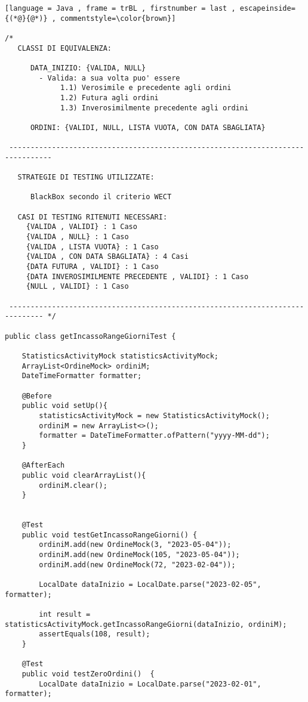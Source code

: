\begin{lstlisting}[language = Java , frame = trBL , firstnumber = last , escapeinside={(*@}{@*)} , commentstyle=\color{brown}]

/*
   CLASSI DI EQUIVALENZA:
   
      DATA_INIZIO: {VALIDA, NULL}
        - Valida: a sua volta puo' essere
             1.1) Verosimile e precedente agli ordini
             1.2) Futura agli ordini
             1.3) Inverosimilmente precedente agli ordini

      ORDINI: {VALIDI, NULL, LISTA VUOTA, CON DATA SBAGLIATA}

 --------------------------------------------------------------------------------

   STRATEGIE DI TESTING UTILIZZATE:

      BlackBox secondo il criterio WECT
      
   CASI DI TESTING RITENUTI NECESSARI:
     {VALIDA , VALIDI} : 1 Caso
     {VALIDA , NULL} : 1 Caso
     {VALIDA , LISTA VUOTA} : 1 Caso
     {VALIDA , CON DATA SBAGLIATA} : 4 Casi
     {DATA FUTURA , VALIDI} : 1 Caso
     {DATA INVEROSIMILMENTE PRECEDENTE , VALIDI} : 1 Caso
     {NULL , VALIDI} : 1 Caso

 ------------------------------------------------------------------------------ */  
   
public class getIncassoRangeGiorniTest {

    StatisticsActivityMock statisticsActivityMock;
    ArrayList<OrdineMock> ordiniM;
    DateTimeFormatter formatter;

    @Before
    public void setUp(){
        statisticsActivityMock = new StatisticsActivityMock();
        ordiniM = new ArrayList<>();
        formatter = DateTimeFormatter.ofPattern("yyyy-MM-dd");
    }

    @AfterEach
    public void clearArrayList(){
        ordiniM.clear();
    }


    @Test
    public void testGetIncassoRangeGiorni() {
        ordiniM.add(new OrdineMock(3, "2023-05-04"));
        ordiniM.add(new OrdineMock(105, "2023-05-04"));
        ordiniM.add(new OrdineMock(72, "2023-02-04"));

        LocalDate dataInizio = LocalDate.parse("2023-02-05", formatter);

        int result = statisticsActivityMock.getIncassoRangeGiorni(dataInizio, ordiniM);
        assertEquals(108, result);
    }

    @Test
    public void testZeroOrdini()  {
        LocalDate dataInizio = LocalDate.parse("2023-02-01", formatter);


\end{lstlisting}
